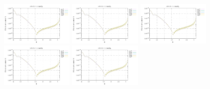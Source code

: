 \noindent
\includegraphics[width=3.5cm]{python_codes/fieldstone_152/RESULTS/exp2/sr2_32_m2}
\includegraphics[width=3.5cm]{python_codes/fieldstone_152/RESULTS/exp2/sr2_32_m3}
\includegraphics[width=3.5cm]{python_codes/fieldstone_152/RESULTS/exp2/sr2_32_m4}
\includegraphics[width=3.5cm]{python_codes/fieldstone_152/RESULTS/exp2/sr2_32_m5}
\includegraphics[width=3.5cm]{python_codes/fieldstone_152/RESULTS/exp2/sr2_32_m6}

